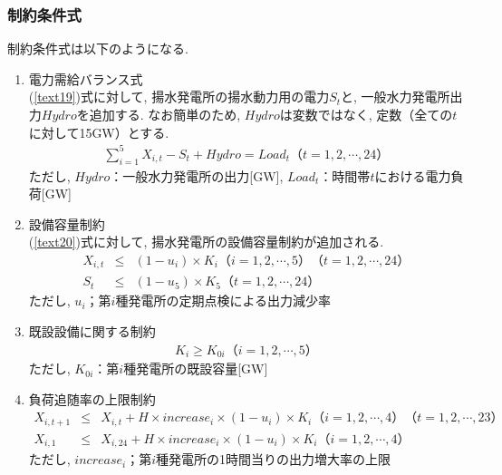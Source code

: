 \documentclass[]{jsarticle}
\begin{document}
      \subsubsection{制約条件式}
          制約条件式は以下のようになる.
          \begin{enumerate}
          \renewcommand{\labelenumi}{(\alph{enumi})}
            \item 電力需給バランス式\\
              (\ref{text19})式に対して, 揚水発電所の揚水動力用の電力$S_t$と, 一般水力発電所出力$Hydro$を追加する. なお簡単のため, $Hydro$は変数ではなく, 定数（全ての$t$に対して15GW）とする.
              \begin{eqnarray}
                \label{jouken_first}
                \sum_{i=1}^5 X_{i,t} - S_t + Hydro = Load_t　（t = 1, 2, \cdots , 24）
              \end{eqnarray}
              ただし, $Hydro$：一般水力発電所の出力[GW], $Load_t$：時間帯$t$における電力負荷[GW]\\

            \item 設備容量制約\\
              (\ref{text20})式に対して, 揚水発電所の設備容量制約が追加される.
              \begin{eqnarray}
                X_{i,t} &\le& (1 - u_i)\times K_i　（i = 1, 2, \cdots , 5）（t = 1, 2, \cdots , 24）\\
                S_t &\le& (1 - u_5) \times K_5　（t = 1, 2, \cdots , 24）
              \end{eqnarray}
              ただし, $u_i$；第$i$種発電所の定期点検による出力減少率\\

            \item 既設設備に関する制約
              \begin{eqnarray}
                K_i \ge K_{0i}　（i = 1, 2, \cdots , 5）
              \end{eqnarray}
              ただし, $K_{0i}$：第$i$種発電所の既設容量[GW]\\

            \item 負荷追随率の上限制約
              \begin{eqnarray}
                X_{i,t+1} &\le& X_{i,t} + H \times increase_i \times (1-u_i) \times K_i　（i = 1, 2, \cdots , 4）（t = 1, 2, \cdots , 23）\\
                X_{i,1} &\le& X_{i,24} + H \times increase_i \times (1-u_i) \times K_i　（i = 1, 2, \cdots , 4）
              \end{eqnarray}
              ただし, $increase_i$；第$i$種発電所の1時間当りの出力増大率の上限\\


\end{enumerate}
\end{document}
